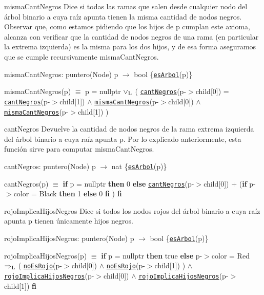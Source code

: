 \begin{DoxyParagraph}{misma\-Cant\-Negros}
Dice si todas las ramas que salen desde cualquier nodo del árbol binario a cuya raíz apunta tienen la misma cantidad de nodos negros. Observar que, como estamos pidiendo que los hijos de p cumplan este axioma, alcanza con verificar que la cantidad de nodos negros de una rama (en particular la extrema izquierda) es la misma para los dos hijos, y de esa forma aseguramos que se cumple recursivamente misma\-Cant\-Negros.

misma\-Cant\-Negros\-: puntero(\-Node) p $\to$ bool \{\href{axiomas.html#esArbol}{\tt es\-Arbol}(p)\} \par
misma\-Cant\-Negros(p) $\equiv$ p = nullptr $\lor_{\rm L}$ ( \href{axiomas.html#cantNegros}{\tt cant\-Negros}(p-\/$>$child\mbox{[}0\mbox{]}) = \href{axiomas.html#cantNegros}{\tt cant\-Negros}(p-\/$>$child\mbox{[}1\mbox{]}) $\land$ \href{axiomas.html#mismaCantNegros}{\tt misma\-Cant\-Negros}(p-\/$>$child\mbox{[}0\mbox{]}) $\land$ \href{axiomas.html#mismaCantNegros}{\tt misma\-Cant\-Negros}(p-\/$>$child\mbox{[}1\mbox{]}) )


\end{DoxyParagraph}
\begin{DoxyParagraph}{cant\-Negros}
Devuelve la cantidad de nodos negros de la rama extrema izquierda del árbol binario a cuya raíz apunta p. Por lo explicado anteriormente, esta función sirve para computar misma\-Cant\-Negros.

cant\-Negros\-: puntero(\-Node) p $\to$ nat \{\href{axiomas.html#esArbol}{\tt es\-Arbol}(p)\} \par
cant\-Negros(p) $\equiv$ {\bfseries if} p = nullptr {\bfseries then} 0 {\bfseries else} \href{axiomas.html#cantNegros}{\tt cant\-Negros}(p-\/$>$child\mbox{[}0\mbox{]}) $+$ ({\bfseries if} p-\/$>$color = Black {\bfseries then} 1 {\bfseries else} 0 {\bfseries fi} ) {\bfseries fi} 


\end{DoxyParagraph}
\begin{DoxyParagraph}{rojo\-Implica\-Hijos\-Negros}
Dice si todos los nodos rojos del árbol binario a cuya raíz apunta p tienen únicamente hijos negros.

rojo\-Implica\-Hijos\-Negros\-: puntero(\-Node) p $\to$ bool \{\href{axiomas.html#esArbol}{\tt es\-Arbol}(p)\} \par
rojo\-Implica\-Hijos\-Negros(p) $\equiv$ {\bfseries if} p = nullptr {\bfseries then} true {\bfseries else} p-\/$>$color = Red $\Rightarrow_{\rm L}$ ( \href{axiomas.html#noEsRojo}{\tt no\-Es\-Rojo}(p-\/$>$child\mbox{[}0\mbox{]}) $\land$ \href{axiomas.html#noEsRojo}{\tt no\-Es\-Rojo}(p-\/$>$child\mbox{[}1\mbox{]}) ) $\land$ \href{axiomas.html#rojoImplicaHijosNegros}{\tt rojo\-Implica\-Hijos\-Negros}(p-\/$>$child\mbox{[}0\mbox{]}) $\land$ \href{axiomas.html#rojoImplicaHijosNegros}{\tt rojo\-Implica\-Hijos\-Negros}(p-\/$>$child\mbox{[}1\mbox{]}) {\bfseries fi} 


\end{DoxyParagraph}
